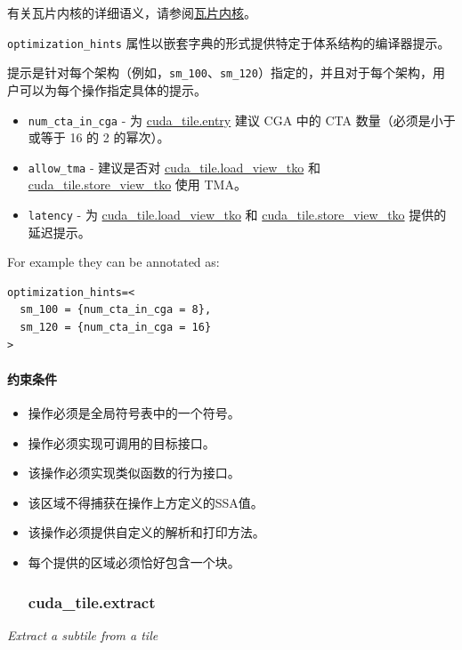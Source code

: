 \documentclass{article}
\begin{document}
有关瓦片内核的详细语义，请参阅\href{https://docs.nvidia.com/cuda/tile-ir/latest/sections/semantics.html#sub-sec-tile-kernel}{瓦片内核}。


\texttt{optimization\_hints} 属性以嵌套字典的形式提供特定于体系结构的编译器提示。


提示是针对每个架构（例如，\texttt{sm\_100}、\texttt{sm\_120}）指定的，并且对于每个架构，用户可以为每个操作指定具体的提示。


\begin{itemize}
\item \texttt{num\_cta\_in\_cga} - 为 \href{https://docs.nvidia.com/cuda/tile-ir/latest/sections/operations.html#op-cuda-tile-entry}{cuda\_tile.entry} 建议 CGA 中的 CTA 数量（必须是小于或等于 16 的 2 的幂次）。
\item \texttt{allow\_tma} - 建议是否对 \href{https://docs.nvidia.com/cuda/tile-ir/latest/sections/operations.html#op-cuda-tile-load-view-tko}{cuda\_tile.load\_view\_tko} 和 \href{https://docs.nvidia.com/cuda/tile-ir/latest/sections/operations.html#op-cuda-tile-store-view-tko}{cuda\_tile.store\_view\_tko} 使用 TMA。
\item \texttt{latency} - 为 \href{https://docs.nvidia.com/cuda/tile-ir/latest/sections/operations.html#op-cuda-tile-load-view-tko}{cuda\_tile.load\_view\_tko} 和 \href{https://docs.nvidia.com/cuda/tile-ir/latest/sections/operations.html#op-cuda-tile-store-view-tko}{cuda\_tile.store\_view\_tko} 提供的延迟提示。

\end{itemize}
For example they can be annotated as:


\begin{lstlisting}
optimization_hints=<
  sm_100 = {num_cta_in_cga = 8},
  sm_120 = {num_cta_in_cga = 16}
>
\end{lstlisting}


\paragraph{约束条件}

\begin{itemize}
\item 操作必须是全局符号表中的一个符号。
\item 操作必须实现可调用的目标接口。
\item 该操作必须实现类似函数的行为接口。
\item 该区域不得捕获在操作上方定义的SSA值。
\item 该操作必须提供自定义的解析和打印方法。
\item 每个提供的区域必须恰好包含一个块。


\subsubsection{cuda\_tile.extract}

\end{itemize}
\textit{Extract a subtile from a tile}
\end{document}
